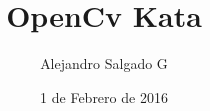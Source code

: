 \documentclass{beamer}
\begin{document}
    \title{OpenCv Kata}
    \author{Alejandro Salgado G}
    \date{1 de Febrero de 2016}

    \frame{\titlepage}
\end{document}
